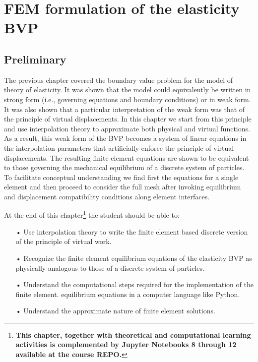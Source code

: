 %
\graphicspath{ {./img/Computational/} }
\chapter{FEM formulation of the elasticity BVP}
\label{chap: Computational Aspects}

\section*{Preliminary}
The previous chapter covered the boundary value problem for the model of theory of elasticity. It was shown that the model could equivalently be written in strong form (i.e., governing equations and boundary conditions) or in weak form. It was also shown that a particular interpretation of the weak form was that of the principle of virtual displacements. In this chapter we start from this principle and use interpolation theory to approximate both physical and virtual functions. As a result, this weak form of the BVP becomes a system of linear equations in the interpolation parameters that artificially enforce the principle of virtual displacements. The resulting finite element equations are shown to be equivalent to those governing the mechanical equilibrium of a discrete system of particles. To facilitate conceptual understanding we find first the equations for a single element and then proceed to consider the full mesh after invoking equilibrium and displacement compatibility conditions along element interfaces.

At the end of this chapter\footnote{{\bf This chapter, together with theoretical and computational learning activities is complemented by Jupyter Notebooks 8 through 12 available at the course REPO.}} the student should be able to:


\begin{itemize}
\item[•] Use interpolation theory to write the finite element based discrete version of the principle of virtual work.

\item[•] Recognize the finite element equilibrium equations of the elasticity BVP as physically analogous to those of a discrete system of particles.

\item[•] Understand the computational steps required for the implementation of the finite element. equilibrium equations in a computer language like Python.

\item[•] Understand the approximate nature of finite element solutions.

\end{itemize}

